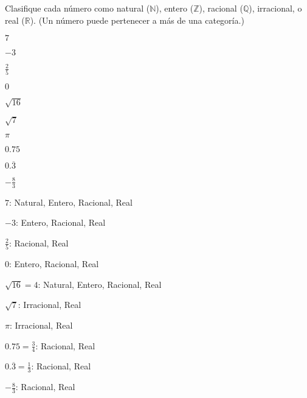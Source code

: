 \begin{exercise}
\problem Clasifique cada número como natural ($\mathbb{N}$), entero ($\mathbb{Z}$), racional ($\mathbb{Q}$), irracional, o real ($\mathbb{R}$). (Un número puede pertenecer a más de una categoría.)

\begin{exerciselist}
    \item $7$
    \item $-3$
    \item $\frac{2}{5}$
    \item $0$
    \item $\sqrt{16}$
    \item $\sqrt{7}$
    \item $\pi$
    \item $0.75$
    \item $0.\overline{3}$
    \item $-\frac{8}{3}$
\end{exerciselist}

\begin{solucion}
\begin{exerciselist}
    \item $7$: Natural, Entero, Racional, Real
    \item $-3$: Entero, Racional, Real
    \item $\frac{2}{5}$: Racional, Real
    \item $0$: Entero, Racional, Real
    \item $\sqrt{16} = 4$: Natural, Entero, Racional, Real
    \item $\sqrt{7}$: Irracional, Real
    \item $\pi$: Irracional, Real
    \item $0.75 = \frac{3}{4}$: Racional, Real
    \item $0.\overline{3} = \frac{1}{3}$: Racional, Real
    \item $-\frac{8}{3}$: Racional, Real
\end{exerciselist}
\end{solucion}
\end{exercise}

